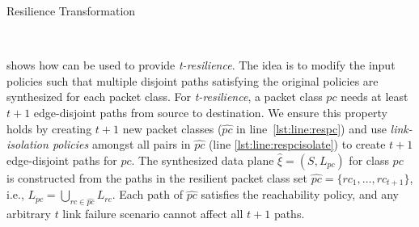 \begin{algorithm}[h]
	\begin{footnotesize}
		\caption{Resilience Transformation}
		\label{restransform}
		\begin{algorithmic}[1]
			\vspace*{0.25cm}
			 \label{lst:line:respc}
			  \label{lst:line:respcisolate}
			 \label{lst:line:respcend}
			\EndFor
			 \label{lst:line:respolicy}
			\EndFor \\
		\end{algorithmic}
	\end{footnotesize}
\end{algorithm}

 shows how \Name can be used to provide \emph{t-resilience}.
The idea is to modify the input policies such that multiple disjoint paths satisfying the original
policies are synthesized for each packet class. 
For \emph{t-resilience}, a packet class $pc$ needs at least $t+1$ edge-disjoint paths from
source to destination. 
We ensure this property holds by creating 
$t+1$ new packet classes ($\hat{pc}$ in line~\ref{lst:line:respc})
and use {\em link-isolation policies} amongst all pairs in $\hat{pc}$ (line \ref{lst:line:respcisolate})
to create $t+1$ edge-disjoint paths for $pc$.
The synthesized data plane $\hat{\xi} = (S, L_{pc})$ for class $pc$ is constructed from the 
paths in the resilient packet class set $\hat{pc} = \{rc_1,\ldots,rc_{t+1}\}$,
i.e., $L_{pc} = \bigcup\limits_{rc \in \hat{pc}} L_{rc}$.  
Each path of $\hat{pc}$ satisfies the reachability policy, 
and any arbitrary $t$ link failure scenario cannot affect all $t+1$ paths.

